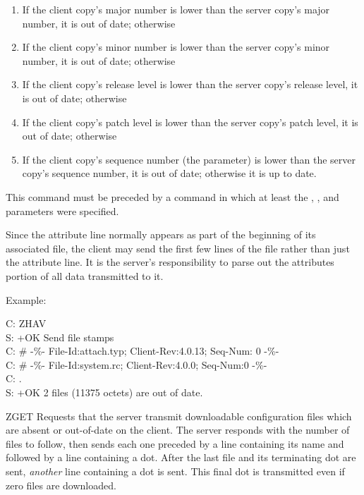 \begin{codelist}
\begin{enumerate}
\item If the client copy's major number is lower than the server
copy's major number, it is out of date; otherwise
\item If the client copy's minor number is lower than the server
copy's minor number, it is out of date; otherwise
\item If the client copy's release level is lower than the server
copy's release level, it is out of date; otherwise
\item If the client copy's patch level is lower than the server copy's
patch level, it is out of date; otherwise
\item If the client copy's sequence number (the 
parameter) is lower than the server copy's sequence number, it is out
of date; otherwise it is up to date.
\end{enumerate}

This command must be preceded by a  command in which at
least the , , and 
parameters were specified.

Since the attribute line normally appears as part of the beginning of
its associated file, the client may send the first few lines of the
file rather than just the attribute line.  It is the server's
responsibility to parse out the attributes portion of all data
transmitted to it.

Example:

\begin{conversation}
C: ZHAV \\
S: +OK Send file stamps \\
C: \# -\%- File-Id:attach.typ; Client-Rev:4.0.13; Seq-Num: 0 -\%- \\
C: \# -\%- File-Id:system.rc; Client-Rev:4.0.0; Seq-Num:0 -\%- \\
C: . \\
S: +OK 2 files (11375 octets) are out of date.
\end{conversation}

\item[ZGET] Requests that the server transmit downloadable
configuration files which are absent or out-of-date on the client.
The server responds with the number of files to follow, then sends
each one preceded by a line containing its name and followed by a line
containing a dot.  After the last file and its terminating dot are
sent, \emph{another} line containing a dot is sent.  This final dot is
transmitted even if zero files are downloaded.


\end{codelist}
